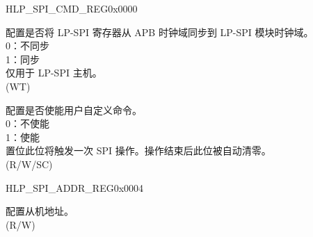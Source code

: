 \begin{register}{H}{LP\_SPI\_CMD\_REG}{0x0000}\label{regdesc:LPSPICMDREG}
%
%
%
%
\regnewline%
\begin{regdesc}\begin{reglist}
\label{fielddesc:LPSPIUPDATE}\item [LP\_SPI\_UPDATE] 配置是否将 LP-SPI 寄存器从 APB 时钟域同步到 LP-SPI 模块时钟域。\\
0：不同步\\
1：同步\\
仅用于 LP-SPI 主机。\\ (WT)
\label{fielddesc:LPSPIUSR}\item [LP\_SPI\_USR] 配置是否使能用户自定义命令。 \\
0：不使能 \\
1：使能 \\
置位此位将触发一次 SPI 操作。操作结束后此位被自动清零。 \\
(R/W/SC)
\end{reglist}\end{regdesc}
\end{register}


\begin{register}{H}{LP\_SPI\_ADDR\_REG}{0x0004}\label{regdesc:LPSPIADDRREG}
%
\regnewline%
\begin{regdesc}\begin{reglist}
\label{fielddesc:LPSPIUSRADDRVALUE}\item [LP\_SPI\_USR\_ADDR\_VALUE] 配置从机地址。\\

(R/W)
\end{reglist}\end{regdesc}
\end{register}


